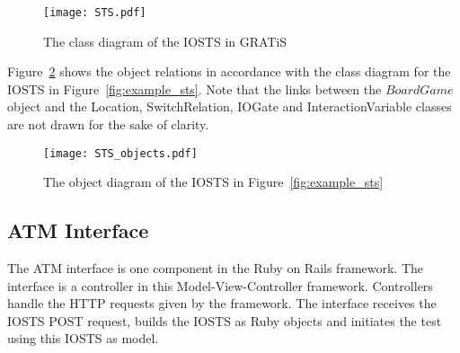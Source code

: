 \begin{figure}[ht]
  \begin{center}
    \texttt{[image: STS.pdf]}
  \end{center}
  \caption{The class diagram of the IOSTS in GRATiS}
  \label{fig:sts-diagram}
\end{figure}

Figure~\ref{fig:sts-objects} shows the object relations in accordance with the class diagram for the IOSTS in Figure~\ref{fig:example_sts}. Note that the links between the $\mathit{BoardGame}$ object and the Location, SwitchRelation, IOGate and InteractionVariable classes are not drawn for the sake of clarity.

\begin{figure}[ht]
  \begin{center}
    \texttt{[image: STS\_objects.pdf]}
  \end{center}
  \caption{The object diagram of the IOSTS in Figure~\ref{fig:example_sts}}
  \label{fig:sts-objects}
\end{figure}

\subsection{ATM Interface}
The ATM interface is one component in the Ruby on Rails framework. The interface is a controller in this Model-View-Controller framework. Controllers handle the HTTP requests given by the framework. The interface receives the IOSTS POST request, builds the IOSTS as Ruby objects and initiates the test using this IOSTS as model.